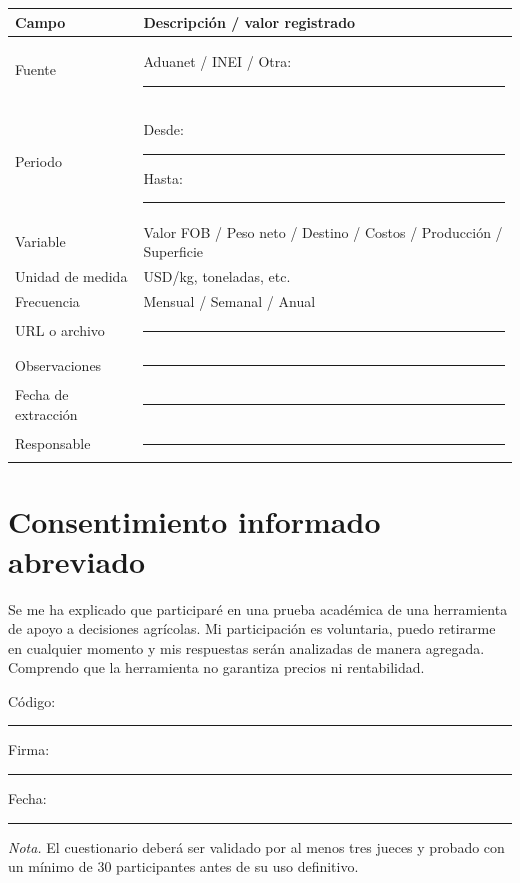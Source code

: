 \footnotesize
\begin{tabularx}{\textwidth}{p{3.5cm}X}
\toprule
\textbf{Campo} & \textbf{Descripci\'on / valor registrado} \\
\midrule
Fuente & Aduanet / INEI / Otra: \rule{4cm}{0.4pt} \\
Periodo & Desde: \rule{2cm}{0.4pt} \quad Hasta: \rule{2cm}{0.4pt} \\
Variable & Valor FOB / Peso neto / Destino / Costos / Producción / Superficie \\
Unidad de medida & USD/kg, toneladas, etc. \\
Frecuencia & Mensual / Semanal / Anual \\
URL o archivo & \rule{8cm}{0.4pt} \\
Observaciones & \rule{8cm}{0.4pt} \\
Fecha de extracci\'on & \rule{4cm}{0.4pt} \\
Responsable & \rule{4cm}{0.4pt} \\
\bottomrule
\end{tabularx}

\section{Consentimiento informado abreviado}

Se me ha explicado que participaré en una prueba académica de una herramienta de apoyo a decisiones agrícolas. Mi participación es voluntaria, puedo retirarme en cualquier momento y mis respuestas serán analizadas de manera agregada. Comprendo que la herramienta no garantiza precios ni rentabilidad.

\vspace{12pt}
\noindent Código: \rule{3cm}{0.4pt}\hfill Firma: \rule{4cm}{0.4pt}\hfill Fecha: \rule{3cm}{0.4pt}

\parbox{0.94\textwidth}{\small \textit{Nota.} El cuestionario deberá ser validado por al menos tres jueces y probado con un mínimo de 30 participantes antes de su uso definitivo.}
